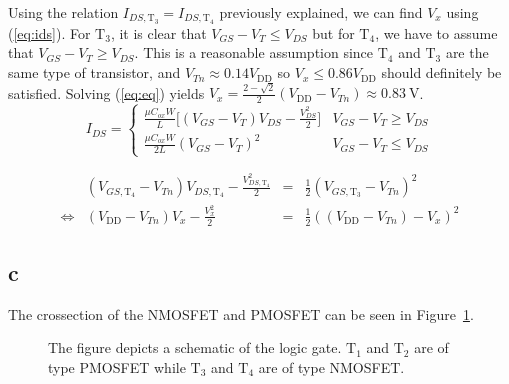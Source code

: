 \documentclass[12pt,a4paper]{article}
\begin{document}
Using the relation $I_{DS,\text{T}_3} = I_{DS,\text{T}_4}$ previously explained, we can find $V_x$ using (\ref{eq:ids}).
For $\text{T}_3$, it is clear that $V_{GS}-V_T \leq V_{DS}$ but for $\text{T}_4$, we have to assume that $V_{GS}-V_T \geq V_{DS}$.
This is a reasonable assumption since $\text{T}_4$ and $\text{T}_3$ are the same type of transistor, and $V_{Tn}\approx 0.14V_{\text{DD}}$ so $V_x \leq 0.86V_{\text{DD}}$ should definitely be satisfied.
Solving (\ref{eq:eq}) yields $V_x=\frac{2-\sqrt{2}}{2}(V_{\text{DD}}-V_{Tn})\approx \SI{0.83}{\volt}$.
\begin{equation}
  \label{eq:ids}
  I_{DS}=
  \begin{cases}
    \frac{\mu C_{ox} W}{L} \Big[(V_{GS}-V_T)V_{DS} - \frac{V^2_{DS}}{2} \Big] & V_{GS}-V_T \geq V_{DS} \\
    \frac{\mu C_{ox} W}{2 L} (V_{GS}-V_T)^2 & V_{GS}-V_T \leq V_{DS}
  \end{cases}
\end{equation}

\begin{equation}
  \begin{array}{clcl}
    \label{eq:eq}
     & (V_{GS,\text{T}_4}-V_{Tn})V_{DS,\text{T}_4} - \frac{V^2_{DS,\text{T}_4}}{2} & = & \frac{1}{2}(V_{GS,\text{T}_3}-V_{Tn})^2 \\
    \Leftrightarrow & (V_{\text{DD}}-V_{Tn})V_x - \frac{V^2_x}{2} & = & \frac{1}{2}((V_{\text{DD}}-V_{Tn})-V_x)^2  
  \end{array}
\end{equation}

\subsection{c}
The crossection of the NMOSFET and PMOSFET can be seen in Figure~\ref{fig:crossection}.

\begin{figure}[!ht]
  \centering
  \noindent\makebox[\textwidth]{\scalebox{0.7}{}}
  \caption{The figure depicts a schematic of the logic gate. $\text{T}_{1}$ and $\text{T}_{2}$ are of type PMOSFET while $\text{T}_{3}$ and $\text{T}_{4}$ are of type NMOSFET.}
  \label{fig:crossection}
\end{figure}
\end{document}
